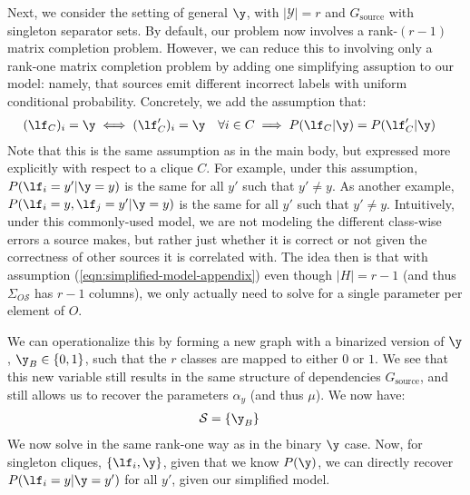 \documentclass[letterpaper]{article}
\begin{document}
\begin{appendix}
Next, we consider the setting of general $\y$, with $|\mathcal{Y}| = r$ and $G_{\text{source}}$ with singleton separator sets.
By default, our problem now involves a rank-$(r-1)$ matrix completion problem.
However, we can reduce this to involving only a rank-one matrix completion problem by adding one simplifying assuption to our model: namely, that sources emit different incorrect labels with uniform conditional probability.
Concretely, we add the assumption that:
\begin{align}
	\label{eqn:simplified-model-appendix}
	(\lf_C)_i = \y \iff (\lf'_C)_i = \y ~~~ \forall i \in C
	& \implies
	P(\lf_C | \y)
	=
	P(\lf'_C | \y)
\end{align}
Note that this is the same assumption as in the main body, but expressed more explicitly with respect to a clique $C$.
For example, under this assumption, $P(\lf_i=y'|\y=y)$ is the same for all $y'$ such that $y' \neq y$.
As another example, $P(\lf_i=y, \lf_j=y'|\y=y)$ is the same for all $y'$ such that $y' \neq y$.
Intuitively, under this commonly-used model, we are not modeling the different class-wise errors a source makes, but rather just whether it is correct or not given the correctness of other sources it is correlated with.
The idea then is that with assumption (\ref{eqn:simplified-model-appendix}) even though $|H| = r - 1$ (and thus $\Sigma_{O\mathcal{S}}$ has $r-1$ columns), we only actually need to solve for a single parameter per element of $O$.

We can operationalize this by forming a new graph with a binarized version of $\y$, $\y_B \in \{0,1\}$, such that the $r$ classes are mapped to either $0$ or $1$.
We see that this new variable still results in the same structure of dependencies $G_{\text{source}}$, and still allows us to recover the parameters $\alpha_y$ (and thus $\mu$).
We now have:
\begin{align*}
	\mathcal{S}
	&=
	\{ \y_B \}
\end{align*}
We now solve in the same rank-one way as in the binary $\y$ case.
Now, for singleton cliques, $\{ \lf_i, \y \}$, given that we know $P(\y)$, we can directly recover $P(\lf_i=y | \y=y')$ for all $y'$, given our simplified model.


\end{appendix}
\end{document}
